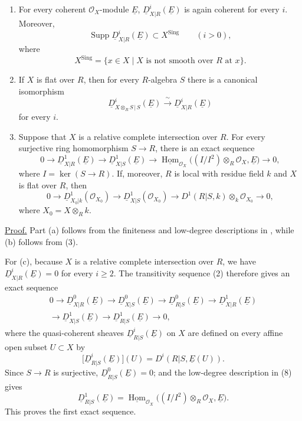 \begin{enumerate}[label=(\alph*)]
\item For every coherent $\mathcal O_X$-module $\underline E$,
$\underline D^i_{X|R}(\underline E)$ is again coherent for every
$i$. Moreover,
\[
 \operatorname{Supp}\underline D^i_{X|R}(\underline E)
 \subset X^{\mathrm{Sing}}
 \qquad(i>0),
\]
where
\[
 X^{\mathrm{Sing}}
 =\{x\in X\mid X\text{ is not smooth over }R\text{ at }x\}.
\]

\item If $X$ is flat over $R$, then for every $R$-algebra $S$ there
is a canonical isomorphism
\[
 \underline D^i_{X\otimes_RS\,|\,S}(\underline E)
 \xrightarrow{\ \sim\ }
 \underline D^i_{X|R}(\underline E)
\]
for every $i$.

\item Suppose that $X$ is a relative complete intersection over
$R$. For every surjective ring homomorphism $S\longrightarrow R$,
there is an exact sequence
\[
0\longrightarrow\underline D^1_{X|R}(\underline E)
\longrightarrow\underline D^1_{X|S}(\underline E)
\longrightarrow
\underline{\operatorname{Hom}}_{\mathcal O_X}
 \bigl((I/I^2)\otimes_R\mathcal O_X,\underline E\bigr)
\longrightarrow0,
\]
where $I=\ker(S\longrightarrow R)$. If, moreover, $R$ is local
with residue field $k$ and $X$ is flat over $R$, then
\[
0\longrightarrow
 \underline D^1_{X_0|k}(\mathcal O_{X_0})
\longrightarrow
 \underline D^1_{X|S}(\mathcal O_{X_0})
\longrightarrow
 D^1(R|S,k)\otimes_k\mathcal O_{X_0}
\longrightarrow0,
\]
where $X_0=X\otimes_Rk$.
\end{enumerate}

\underline{Proof.}
Part (a) follows from the finiteness and low-degree descriptions in
, while (b) follows from (3).

For (c), because $X$ is a relative complete intersection over $R$,
we have $\underline D^i_{X|R}(\underline E)=0$ for every $i\geq2$.
The transitivity sequence (2) therefore gives an exact sequence
\begin{multline*}
0\longrightarrow\underline D^0_{X|R}(\underline E)
\longrightarrow\underline D^0_{X|S}(\underline E)
\longrightarrow\underline D^0_{R|S}(\underline E)
\longrightarrow\underline D^1_{X|R}(\underline E)\\
\longrightarrow\underline D^1_{X|S}(\underline E)
\longrightarrow\underline D^1_{R|S}(\underline E)
\longrightarrow0,
\end{multline*}
where the quasi-coherent sheaves
$\underline D^i_{R|S}(\underline E)$ on $X$ are defined on every
affine open subset $U\subset X$ by
\[
 \bigl[\underline D^i_{R|S}(\underline E)\bigr](U)
 =D^i(R|S,\underline E(U)).
\]
Since $S\longrightarrow R$ is surjective,
$\underline D^0_{R|S}(\underline E)=0$; and the low-degree
description in (8) gives
\[
 \underline D^1_{R|S}(\underline E)
 =\underline{\operatorname{Hom}}_{\mathcal O_X}
  \bigl((I/I^2)\otimes_R\mathcal O_X,\underline E\bigr).
\]
This proves the first exact sequence.


